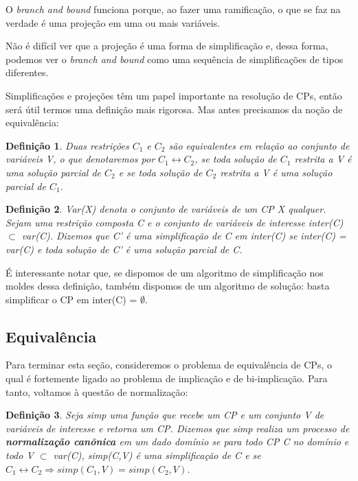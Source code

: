 \documentclass{article}
\newtheorem{definition}{Definição}[section]
\theoremstyle{remark}
\theoremstyle{theorem}
\begin{document}
O \textit{branch and bound} funciona porque, ao fazer uma ramificação, o que se faz na verdade é uma projeção em uma ou mais variáveis.

Não é difícil ver que a projeção é uma forma de simplificação e, dessa forma, podemos ver o \textit{branch and bound} como uma sequência de simplificações de tipos diferentes.

Simplificações e projeções têm um papel importante na resolução de CPs, então será útil termos uma definição mais rigorosa. Mas antes precisamos da noção de equivalência:

\begin{definition}
  Duas restrições $C_1$ e $C_2$ são equivalentes em relação ao conjunto de variáveis V, o que denotaremos por $C_1 \leftrightarrow C_2$, se toda solução de $C_1$ restrita a V é uma solução parcial de $C_2$ e se toda solução de $C_2$ restrita a V é uma solução parcial de $C_1$.
\end{definition}

\begin{definition}
  Var(X) denota o conjunto de variáveis de um CP X qualquer. Sejam uma restrição composta C e o conjunto de variáveis de interesse inter(C) $\subset$ var(C). Dizemos que C' é uma simplificação de C em inter(C) se inter(C) = var(C) e toda solução de C' é uma solução parcial de C.
\end{definition}

É interessante notar que, se dispomos de um algoritmo de simplificação nos moldes dessa definição, também dispomos de um algoritmo de solução: basta simplificar o CP em inter(C) = $\emptyset$.

\subsection{Equivalência}

  Para terminar esta seção, consideremos o problema de equivalência de CPs, o qual é fortemente ligado ao problema de implicação e de bi-implicação. Para tanto, voltamos à questão de normalização:

  \begin{definition}
    Seja \textit{simp} uma função que recebe um CP e um conjunto V de variáveis de interesse e retorna um CP. Dizemos que \textit{simp} realiza um processo de \textbf{normalização canônica} em um dado domínio se para todo CP C no domínio e todo V $\subset$ var(C), simp(C,V) é uma simplificação de C e se $C_1 \leftrightarrow C_2 \Rightarrow simp(C_1,V) = simp(C_2,V)$.
  \end{definition}
\end{document}
